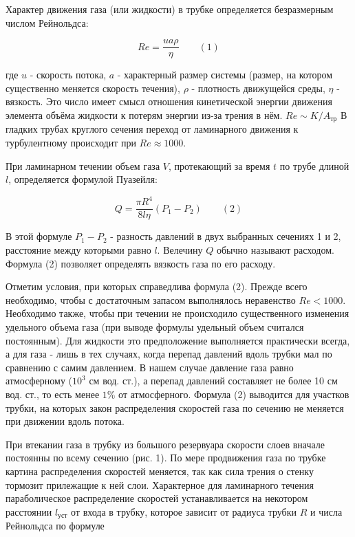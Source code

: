 \documentclass[a4paper,12pt]{article} %
\begin{document}
\medskip

\noindent Характер движения газа (или жидкости) в трубке определяется безразмерным числом Рейнольдса:

\[Re = \dfrac{u a \rho}{\eta} \text{  } \text{  } \text{  }(1)\]

\noindent где $u$ - скорость потока, $a$ - характерный размер системы (размер, на котором существенно меняется скорость течения), $\rho$ - плотность движущейся среды, $\eta$ - вязкость. Это число имеет смысл отношения
кинетической энергии движения элемента объёма жидкости к потерям энергии из-за трения в нём. $Re \sim  K/A_\text{тр} $ В гладких трубах круглого сечения переход от ламинарного движения к турбулентному происходит при $Re \approx 1000$.

\medskip

\noindent При ламинарном течении объем газа $V$, протекающий за время $t$ по трубе длиной $l$, определяется формулой Пуазейля:

\[Q = \dfrac{\pi R^4}{8 l \eta}(P_1 - P_2) \text{  } \text{  } \text{  }(2)\]

\noindent В этой формуле $P_1 - P_2$ - разность давлений в двух выбранных сечениях 1 и 2, расстояние между которыми равно $l$. Велечину $Q$ обычно называют расходом. Формула (2) позволяет определять вязкость газа по его расходу.

\medskip

\noindent Отметим условия, при которых справедлива формула (2). Прежде всего необходимо, чтобы с достаточным запасом выполнялось неравенство $Re < 1000$. Необходимо также, чтобы при течении не происходило существенного изменения удельного объема газа (при выводе формулы удельный объем считался постоянным). Для жидкости это предположение выполняется практически всегда, а для газа - лишь в тех случаях, когда перепад давлений вдоль трубки мал по сравнению с самим давлением. В нашем случае давление газа равно атмосферному ($10^3$ см вод. ст.), а перепад давлений составляет не более 10 см вод. ст., то есть менее $1\%$ от атмосферного. Формула (2) выводится для участков трубки, на которых закон распределения скоростей газа по сечению не меняется при движении вдоль потока.

\medskip


\noindent При втекании газа в трубку из большого резервуара скорости слоев вначале постоянны по всему сечению (рис. 1). По мере продвижения газа по трубке картина распределения скоростей меняется, так как сила трения о стенку тормозит прилежащие к ней слои. Характерное для ламинарного течения параболическое распределение скоростей устанавливается на некотором расстоянии $l_\text{уст}$ от входа в трубку, которое зависит от радиуса трубки $R$ и числа Рейнольдса по формуле
\end{document}
